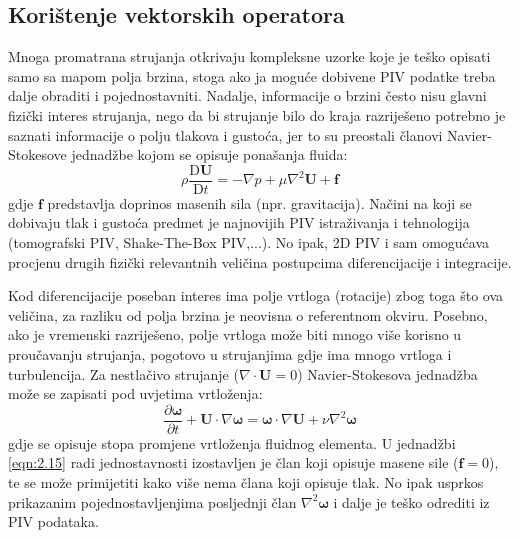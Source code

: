 \subsection{Korištenje vektorskih operatora}
Mnoga promatrana strujanja otkrivaju kompleksne uzorke koje je teško opisati samo sa mapom polja brzina, stoga ako ja moguće dobivene PIV podatke treba dalje obraditi i pojednostavniti. Nadalje, informacije o brzini često nisu glavni fizički interes strujanja, nego da bi strujanje bilo do kraja razriješeno potrebno je saznati informacije o polju tlakova i gustoća, jer to su preostali članovi Navier-Stokesove jednadžbe kojom se opisuje ponašanja fluida:
\begin{equation}
	\rho \dfrac{\mathrm{D}\boldsymbol{U}}{\mathrm{D}t}=-\nabla p+ \mu \nabla^{2}\boldsymbol{U}+\boldsymbol{f}
	\label{eqn:2.14}
\end{equation}
gdje $\boldsymbol{f}$ predstavlja doprinos masenih sila (npr. gravitacija). Načini na koji se dobivaju tlak i gustoća predmet je najnovijih PIV istraživanja i tehnologija (tomografski PIV, Shake-The-Box PIV,...). No ipak, 2D PIV i sam omogućava procjenu drugih fizički relevantnih veličina postupcima diferencijacije i integracije.
\par
Kod diferencijacije poseban interes ima polje vrtloga (rotacije) zbog toga što ova veličina, za razliku od polja brzina je neovisna o referentnom okviru. Posebno, ako je vremenski razriješeno, polje vrtloga može biti mnogo više korisno u proučavanju strujanja, pogotovo u strujanjima gdje ima mnogo vrtloga i turbulencija. Za nestlačivo strujanje ($\nabla \cdot \boldsymbol{U}=0$) Navier-Stokesova jednadžba može se zapisati pod uvjetima vrtloženja:
\begin{equation}
	\dfrac{\partial \boldsymbol{\omega}}{\partial t}+\boldsymbol{U}\cdot\nabla\boldsymbol{\omega}=\boldsymbol{\omega}\cdot\nabla\boldsymbol{U}+\nu\nabla^{2}\boldsymbol{\omega}
	\label{eqn:2.15}
\end{equation}
gdje se opisuje stopa promjene vrtloženja fluidnog elementa. U jednadžbi \ref{eqn:2.15} radi jednostavnosti izostavljen je član koji opisuje masene sile ($\boldsymbol{f}=0$), te se može primijetiti kako više nema člana koji opisuje tlak. No ipak usprkos prikazanim pojednostavljenjima posljednji član $\nabla^{2}\boldsymbol{\omega}$ i dalje je teško odrediti iz PIV podataka.
